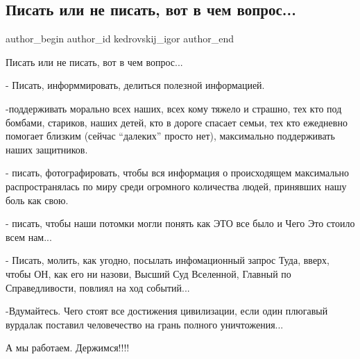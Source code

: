  
 
 
 
 
 
\subsection{Писать или не писать, вот в чем вопрос...}
\label{sec:04_03_2022.fb.kedrovskij_igor.1.pisat_ili_ne_pisat}
 
\ifcmt
 author_begin
   author_id kedrovskij_igor
 author_end
\fi

Писать или не писать, вот в чем вопрос...

- Писать, информмировать, делиться полезной информацией.

-поддерживать морально всех наших, всех кому тяжело и страшно, тех кто под
бомбами, стариков, наших детей, кто в дороге спасает семьи, тех кто ежедневно
помогает близким (сейчас \enquote{далеких} просто нет), максимально
поддерживать наших защитников. 

- писать, фотографировать, чтобы вся информация о происходящем максимально
распространялась по миру среди огромного количества людей, принявших нашу боль
как свою.

- писать, чтобы наши потомки могли понять как ЭТО все было и Чего Это стоило
всем нам...

- Писать, молить, как угодно, посылать инфомационный запрос Туда, вверх, чтобы
ОН, как его ни назови, Высший Суд Вселенной, Главный по Справедливости, повлиял
на ход событий...

-Вдумайтесь. Чего стоят все достижения цивилизации, если один плюгавый вурдалак
поставил человечество на грань полного уничтожения...

А мы работаем. Держимся!!!!
